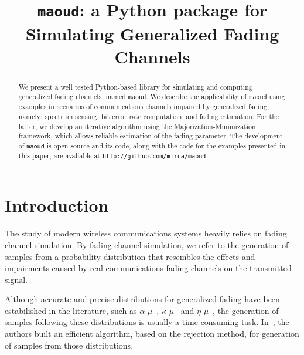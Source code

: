 \documentclass[conference, 10pt]{IEEEtran}
\begin{document}
\title{\texttt{maoud}: a Python package for Simulating Generalized Fading Channels}

\author{
}

\maketitle

\begin{abstract}
    We present a well tested Python-based library for simulating and computing
    generalized fading channels, named \texttt{maoud}. We describe the
    applicability of \texttt{maoud} using examples in scenarios of communications
    channels impaired by generalized fading, namely: spectrum sensing, bit error
    rate computation, and fading estimation. For the latter, we develop an iterative
    algorithm using the Majorization-Minimization framework, which allows reliable
    estimation of the fading parameter. The development of \texttt{maoud} is open
    source and its code, along with the code for the examples presented in this
    paper, are avaliable at \texttt{http://github.com/mirca/maoud}.
\end{abstract}

\IEEEpeerreviewmaketitle
\section{Introduction}

The study of modern wireless communications systems heavily relies on fading channel simulation.
By fading channel simulation, we refer to the generation of samples from a probability distribution
that resembles the effects and impairments caused by real communications fading channels on the
transmitted signal.

Although accurate and precise distributions for generalized fading have been
estabilished in the literature, such as $\alpha\text{-}\mu$~\cite{yacoub.2007.1},
$\kappa\text{-}\mu$~\cite{yacoub.2007.2} and $\eta\text{-}\mu$~\cite{yacoub.2007.2},
the generation of samples following these distributions is usually
a time-consuming task. In~\cite{cogliatti2012}, the authors built an efficient
algorithm, based on the rejection method, for generation of samples from those
distributions.
\end{document}

